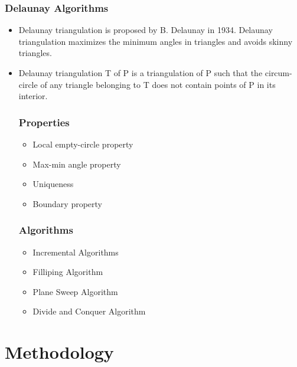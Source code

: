 \documentclass[conference]{IEEEtran}
\begin{document}
    \subsubsection{\textbf{Delaunay Algorithms}}
    \begin{itemize}
        \item Delaunay triangulation is proposed by B. Delaunay in 1934. Delaunay triangulation maximizes the minimum angles in triangles and avoids skinny triangles.
        \item Delaunay triangulation T of P is a triangulation of P such that the circum-circle of any triangle belonging to T does not contain points of P in its interior.
        \subsubsection{Properties}
        \begin{itemize}
            \item Local empty-circle property
            \item Max-min angle property
            \item Uniqueness
            \item Boundary property
        \end{itemize}
        \subsubsection{Algorithms}
        \begin{itemize}
            \item Incremental Algorithms
            \item Filliping Algorithm
            \item Plane Sweep Algorithm
            \item Divide and Conquer Algorithm
        \end{itemize}
    \end{itemize}

\section{Methodology}
\end{document}
